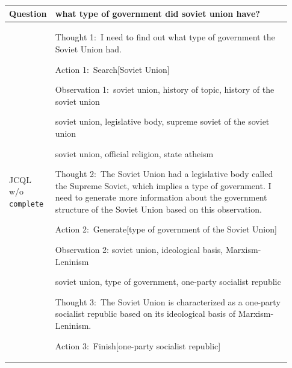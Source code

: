 \renewcommand{\arraystretch}{1.5}
\begin{table}[t!]
\centering
\begin{tabular}{>{\hspace{0pt}}m{0.1\linewidth}|>{\hspace{0pt}}m{0.83\linewidth}} 
\hline
\rowcolor[rgb]{0.8588,0.8588,0.8588} Question   & what type of government did soviet union have? \\ 
\hline
\rowcolor[rgb]{0.9490,0.9490,0.9490} JCQL w/o \texttt{complete}   & Thought 1:~I need to find out what type of government the Soviet Union had.\par{}Action 1:~Search[Soviet Union]\par{}Observation 1:~soviet union, history of topic, history of the soviet union\par{}soviet union, legislative body, supreme soviet of the soviet union\par{}soviet union, official religion, state atheism\par\null\par{}Thought 2:~The Soviet Union had a legislative body called the Supreme Soviet, which implies a type of government. I need to generate more information about the government structure of the Soviet Union based on this observation.\par{}Action 2:~\textcolor[rgb]{0.7529,0,0}{Generate[type of government of the Soviet Union]}\par{}Observation 2: soviet union, ideological basis, Marxism-Leninism\par{}soviet union, type of government, one-party socialist republic\par\null\par{}Thought 3:~The Soviet Union is characterized as a one-party socialist republic based on its ideological basis of Marxism-Leninism.\par{}Action 3:~Finish[one-party socialist republic]  \\
\hline

\end{tabular}
\end{table}
